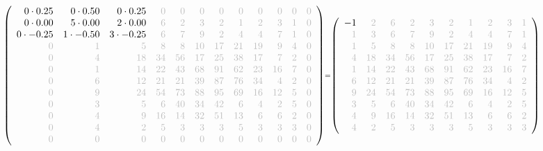 \documentclass[11pt]{article}
\begin{document}
    \[\scriptstyle \def\g{\color{lightgray}}\left(\begin{array}{rrrrrrrrrrrr}0\cdot 0.25 & 0\cdot 0.50 & 0\cdot 0.25 & \g{0} & \g{0} & \g{0} & \g{0} & \g{0} & \g{0} & \g{0} & \g{0} & \g{0}\\0\cdot 0.00 & 5\cdot 0.00 & 2\cdot 0.00 & \g{6} & \g{2} & \g{3} & \g{2} & \g{1} & \g{2} & \g{3} & \g{1} & \g{0}\\0\cdot -0.25 & 1\cdot -0.50 & 3\cdot -0.25 & \g{6} & \g{7} & \g{9} & \g{2} & \g{4} & \g{4} & \g{7} & \g{1} & \g{0}\\\g{0} & \g{1} & \g{5} & \g{8} & \g{8} & \g{10} & \g{17} & \g{21} & \g{19} & \g{9} & \g{4} & \g{0}\\\g{0} & \g{4} & \g{18} & \g{34} & \g{56} & \g{17} & \g{25} & \g{38} & \g{17} & \g{7} & \g{2} & \g{0}\\\g{0} & \g{1} & \g{14} & \g{22} & \g{43} & \g{68} & \g{91} & \g{62} & \g{23} & \g{16} & \g{7} & \g{0}\\\g{0} & \g{6} & \g{12} & \g{21} & \g{21} & \g{39} & \g{87} & \g{76} & \g{34} & \g{4} & \g{2} & \g{0}\\\g{0} & \g{9} & \g{24} & \g{54} & \g{73} & \g{88} & \g{95} & \g{69} & \g{16} & \g{12} & \g{5} & \g{0}\\\g{0} & \g{3} & \g{5} & \g{6} & \g{40} & \g{34} & \g{42} & \g{6} & \g{4} & \g{2} & \g{5} & \g{0}\\\g{0} & \g{4} & \g{9} & \g{16} & \g{14} & \g{32} & \g{51} & \g{13} & \g{6} & \g{6} & \g{2} & \g{0}\\\g{0} & \g{4} & \g{2} & \g{5} & \g{3} & \g{3} & \g{3} & \g{5} & \g{3} & \g{3} & \g{3} & \g{0}\\\g{0} & \g{0} & \g{0} & \g{0} & \g{0} & \g{0} & \g{0} & \g{0} & \g{0} & \g{0} & \g{0} & \g{0}\end{array}\right)=\left(\begin{array}{rrrrrrrrrrrr}-1 & \g{2} & \g{6} & \g{2} & \g{3} & \g{2} & \g{1} & \g{2} & \g{3} & \g{1}\\\g{1} & \g{3} & \g{6} & \g{7} & \g{9} & \g{2} & \g{4} & \g{4} & \g{7} & \g{1}\\\g{1} & \g{5} & \g{8} & \g{8} & \g{10} & \g{17} & \g{21} & \g{19} & \g{9} & \g{4}\\\g{4} & \g{18} & \g{34} & \g{56} & \g{17} & \g{25} & \g{38} & \g{17} & \g{7} & \g{2}\\\g{1} & \g{14} & \g{22} & \g{43} & \g{68} & \g{91} & \g{62} & \g{23} & \g{16} & \g{7}\\\g{6} & \g{12} & \g{21} & \g{21} & \g{39} & \g{87} & \g{76} & \g{34} & \g{4} & \g{2}\\\g{9} & \g{24} & \g{54} & \g{73} & \g{88} & \g{95} & \g{69} & \g{16} & \g{12} & \g{5}\\\g{3} & \g{5} & \g{6} & \g{40} & \g{34} & \g{42} & \g{6} & \g{4} & \g{2} & \g{5}\\\g{4} & \g{9} & \g{16} & \g{14} & \g{32} & \g{51} & \g{13} & \g{6} & \g{6} & \g{2}\\\g{4} & \g{2} & \g{5} & \g{3} & \g{3} & \g{3} & \g{5} & \g{3} & \g{3} & \g{3}\end{array}\right)\]
\end{document}
